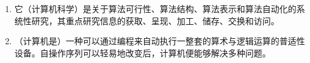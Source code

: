 \documentclass{article}
\begin{document}
    \begin{enumerate}
        \item 它（计算机科学）是关于算法可行性、算法结构、算法表示和算法自动化的系统性研究，其重点研究信息的获取、呈现、加工、储存、交换和访问。
        \item （计算机是）一种可以通过编程来自动执行一整套的算术与逻辑运算的普适性设备。自操作序列可以轻易地改变后，计算机便能够解决多种问题。
    \end{enumerate}

    
\end{document}
